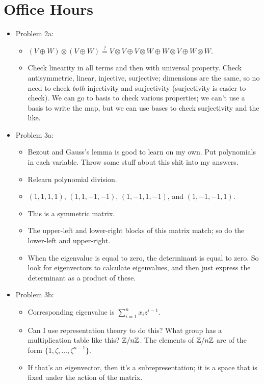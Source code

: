 \documentclass[../notes.tex]{subfiles}
\begin{document}
\section{Office Hours}
\begin{itemize}
    \item {}Problem 2a:
    \begin{itemize}
        \item $(V\oplus W)\otimes(V\oplus W)\stackrel{?}{=}V\otimes V\oplus V\otimes W\oplus W\otimes V\oplus W\otimes W$.
        \item Check linearity in all terms and then with universal property. Check antisymmetric, linear, injective, surjective; dimensions are the same, so no need to check \emph{both} injectivity and surjectivity (surjectivity is easier to check). We can go to basis to check various properties; we can't use a basis to write the map, but we can use bases to check surjectivity and the like.
    \end{itemize}
    \item Problem 3a:
    \begin{itemize}
        \item Bezout and Gauss's lemma is good to learn on my own. Put polynomials in each variable. Throw some stuff about this shit into my answers.
        \item Relearn polynomial division.
        \item $(1,1,1,1)$, $(1,1,-1,-1)$, $(1,-1,1,-1)$, and $(1,-1,-1,1)$.
        \item This is a symmetric matrix.
        \item The upper-left and lower-right blocks of this matrix match; so do the lower-left and upper-right.
        \item When the eigenvalue is equal to zero, the determinant is equal to zero. So look for eigenvectors to calculate eigenvalues, and then just express the determinant as a product of these.
    \end{itemize}
    \item Problem 3b:
    \begin{itemize}
        \item Corresponding eigenvalue is $\sum_{i=1}^nx_iz^{i-1}$.
        \item Can I use representation theory to do this? What group has a multiplication table like this? $\mathbb{Z}/n\mathbb{Z}$. The elements of $\mathbb{Z}/n\mathbb{Z}$ are of the form $\{1,\zeta,\dots,\zeta^{n-1}\}$.
        \item If that's an eigenvector, then it's a subrepresentation; it is a space that is fixed under the action of the matrix.

\end{itemize}
\end{itemize}
\end{document}
